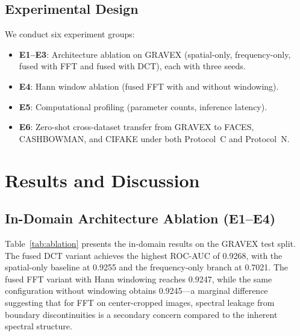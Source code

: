 \documentclass[conference]{IEEEtran}
\begin{document}
\subsection{Experimental Design}

We conduct six experiment groups:
\begin{itemize}[leftmargin=*,nosep]
\item \textbf{E1--E3}: Architecture ablation on GRAVEX (spatial-only, frequency-only, fused with FFT and fused with DCT), each with three seeds.
\item \textbf{E4}: Hann window ablation (fused FFT with and without windowing).
\item \textbf{E5}: Computational profiling (parameter counts, inference latency).
\item \textbf{E6}: Zero-shot cross-dataset transfer from GRAVEX to FACES, CASHBOWMAN, and CIFAKE under both Protocol~C and Protocol~N.
\end{itemize}



\section{Results and Discussion}
\label{sec:results}

\subsection{In-Domain Architecture Ablation (E1--E4)}

Table~\ref{tab:ablation} presents the in-domain results on the GRAVEX test split. The fused DCT variant achieves the highest ROC-AUC of 0.9268, with the spatial-only baseline at 0.9255 and the frequency-only branch at 0.7021. The fused FFT variant with Hann windowing reaches 0.9247, while the same configuration without windowing obtains 0.9245---a marginal difference suggesting that for FFT on center-cropped images, spectral leakage from boundary discontinuities is a secondary concern compared to the inherent spectral structure.
\end{document}
